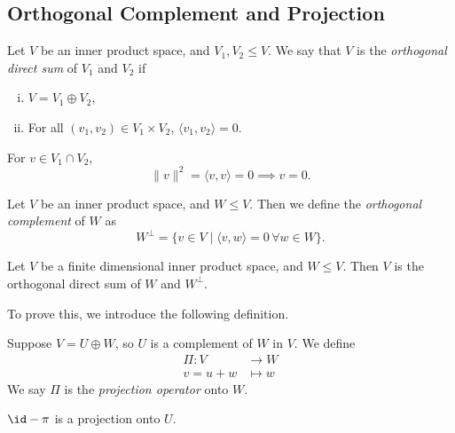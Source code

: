 \documentclass[12pt]{article}
\begin{document}
\subsection{Orthogonal Complement and Projection}
\label{sub:orthogonal_complement_and_projection}

\begin{definition}
	Let $V$ be an inner product space, and $V_1, V_2 \leq V$. We say that $V$ is the \textit{orthogonal direct sum} of $V_1$ and $V_2$ if
	\begin{enumerate}[(i)]
		\item $V = V_1 \oplus V_2$,
		\item For all $(v_1, v_2) \in V_1 \times V_2$, $\langle v_1, v_2 \rangle = 0$.
	\end{enumerate}
\end{definition}

\begin{remark}
	For $v \in V_1 \cap V_2$,
	\[
	\|v\|^2 = \langle v , v \rangle = 0 \implies v = 0
	.\]
\end{remark}

\begin{definition}
	Let $V$ be an inner product space, and $W \leq V$. Then we define the \textit{orthogonal complement} of $W$ as
	\[
		W^{\perp} = \{ v \in V \mid \langle v, w \rangle = 0 \, \forall w \in W\}
	.\]
\end{definition}

\begin{lemma}
	Let $V$ be a finite dimensional inner product space, and $W \leq V$. Then $V$ is the orthogonal direct sum of $W$ and $W^{\perp}$.
\end{lemma}

To prove this, we introduce the following definition.

\begin{definition}
	Suppose $V = U \oplus W$, so $U$ is a complement of $W$ in $V$. We define
	\begin{align*}
		\Pi : V &\to W \\
		v = u + w &\mapsto w
	\end{align*}
	We say $\Pi$ is the \textit{projection operator} onto $W$.
\end{definition}

\begin{remark} 
	$\id - \pi$ is a projection onto $U$.
\end{remark}
\end{document}

